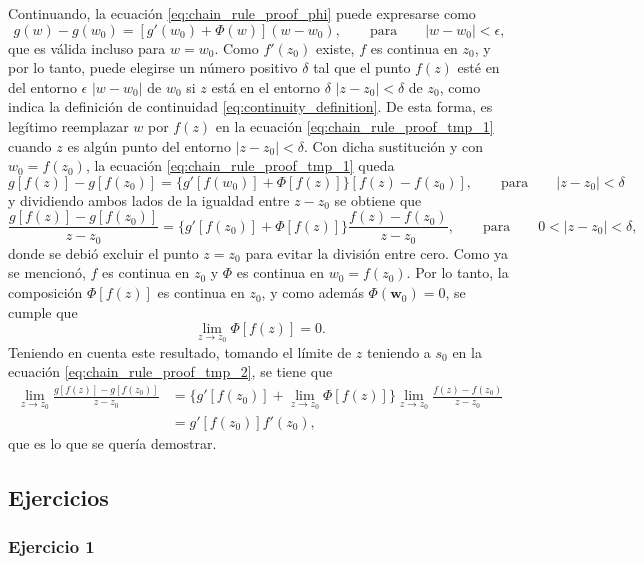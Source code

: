 \documentclass[a4paper]{report}
\newcommand{\w}{\mathbf{w}}
\begin{document}
Continuando, la ecuación \ref{eq:chain_rule_proof_phi} puede expresarse como
\begin{equation}\label{eq:chain_rule_proof_tmp_1}
 g(w)-g(w_0)=[g'(w_0)+\Phi(w)](w-w_0),\qquad\textrm{para}\qquad|w-w_0|<\epsilon,
\end{equation}
que es válida incluso para \(w=w_0\). Como \(f'(z_0)\) existe, \(f\) es continua en \(z_0\), y por lo tanto, puede elegirse un número positivo \(\delta\) tal que el punto \(f(z)\) esté en del entorno \(\epsilon\) \(|w-w_0|\) de \(w_0\) si \(z\) está en el entorno \(\delta\) \(|z-z_0|<\delta\) de \(z_0\), como indica la definición de continuidad \ref{eq:continuity_definition}. De esta forma, es legítimo reemplazar \(w\) por \(f(z)\) en la ecuación \ref{eq:chain_rule_proof_tmp_1} cuando \(z\) es algún punto del entorno \(|z-z_0|<\delta\). Con dicha sustitución y con \(w_0=f(z_0)\), la ecuación \ref{eq:chain_rule_proof_tmp_1} queda
\[
 g[f(z)]-g[f(z_0)]=\{g'[f(w_0)]+\Phi[f(z)]\}[f(z)-f(z_0)],\qquad\textrm{para}\qquad|z-z_0|<\delta
\]
y dividiendo ambos lados de la igualdad entre \(z-z_0\) se obtiene que 
\begin{equation}\label{eq:chain_rule_proof_tmp_2}
 \frac{g[f(z)]-g[f(z_0)]}{z-z_0}=\{g'[f(z_0)]+\Phi[f(z)]\}\frac{f(z)-f(z_0)}{z-z_0},\qquad\textrm{para}\qquad0<|z-z_0|<\delta, 
\end{equation}
donde se debió excluir el punto \(z=z_0\) para evitar la división entre cero. Como ya se mencionó, \(f\) es continua en \(z_0\) y \(\Phi\) es continua en \(w_0=f(z_0)\). Por lo tanto, la composición \(\Phi[f(z)]\) es continua en \(z_0\), y como además \(\Phi(\w_0)=0\), se cumple que 
\[
 \lim_{z\to z_0}\Phi[f(z)]=0.
\]
Teniendo en cuenta este resultado, tomando el límite de \(z\) teniendo a \(s_0\) en la ecuación \ref{eq:chain_rule_proof_tmp_2}, se tiene que 
\begin{align*}
 \lim_{z\to z_0}\frac{g[f(z)]-g[f(z_0)]}{z-z_0}&=\{g'[f(z_0)]+\lim_{z\to z_0}\Phi[f(z)]\}\lim_{z\to z_0}\frac{f(z)-f(z_0)}{z-z_0}\\
  &=g'[f(z_0)]f'(z_0),
\end{align*}
que es lo que se quería demostrar.

\subsection*{Ejercicios}

\subsubsection{Ejercicio 1}
\end{document}

